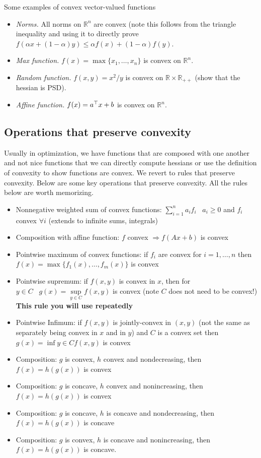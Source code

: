 \documentclass[12pt]{article}
\begin{document}
Some examples of convex vector-valued functions
\begin{itemize}
\item \textit{Norms.} All norms on $\mathbb{R}^n$ are convex (note this follows from the triangle inequality and using it to directly prove $f(\alpha x + (1-\alpha) y) \leq \alpha f(x)+ (1-\alpha) f(y)$.
\item \textit{Max function.} $f(x) = \max\{x_1,\ldots,x_n\}$ is convex on $\mathbb{R}^n$.
\item \textit{Random function.} $f(x,y) = x^2/y$ is convex on $\mathbb{R} \times \mathbb{R}_{++}$ (show that the hessian is PSD).
\item \textit{Affine function.} $f(x) = a^{\top} x + b$ is convex on $\mathbb{R}^n$.
\end{itemize}

\subsection{Operations that preserve convexity}
Usually in optimization, we have functions that are composed with one another and not nice functions that we can directly compute hessians or use the definition of convexity to show functions are convex. We revert to rules that preserve convexity. Below are some key operations that preserve convexity. All the rules below are worth memorizing.

\begin{itemize}
\item Nonnegative weighted sum of convex functions: $\sum\limits_{i=1}^n a_i f_i \;\;\; a_i \geq 0$ and $f_i$ convex $\forall i$ (extends to infinite sums, integrals)
\item Composition with affine function: $f$ convex $\Rightarrow f(Ax+b)$ is convex
\item Pointwise maximum of convex functions: if $f_i$ are convex for $i = 1,\ldots,n$ then $f(x) = \max\{f_1(x),\ldots,f_m(x)\}$ is convex
\item Pointwise supremum: if $f(x,y)$ is convex in $x$, then for $y\in C \;\;\; g(x) = \sup \limits_{y\in C} f(x,y)$ is convex (note $C$ does not need to be convex!) \textbf{This rule you will use repeatedly}
\item Pointwise Infimum: if $f(x,y)$ is jointly-convex in $(x,y)$ (not the same as separately being convex in $x$ and in $y$) and $C$ is a convex set then $g(x) = \inf \limits{y\in C} f(x,y)$ is convex
\item Composition: $g$ is convex, $h$ convex and nondecreasing, then $f(x) = h(g(x))$ is convex
\item Composition: $g$ is concave, $h$ convex and nonincreasing, then $f(x) = h(g(x))$ is convex
\item Composition: $g$ is concave, $h$ is concave and nondecreasing, then $f(x) = h(g(x))$ is concave
\item Composition: $g$ is convex, $h$ is concave and nonincreasing, then $f(x) = h(g(x))$ is concave.
\end{itemize}
\end{document}
